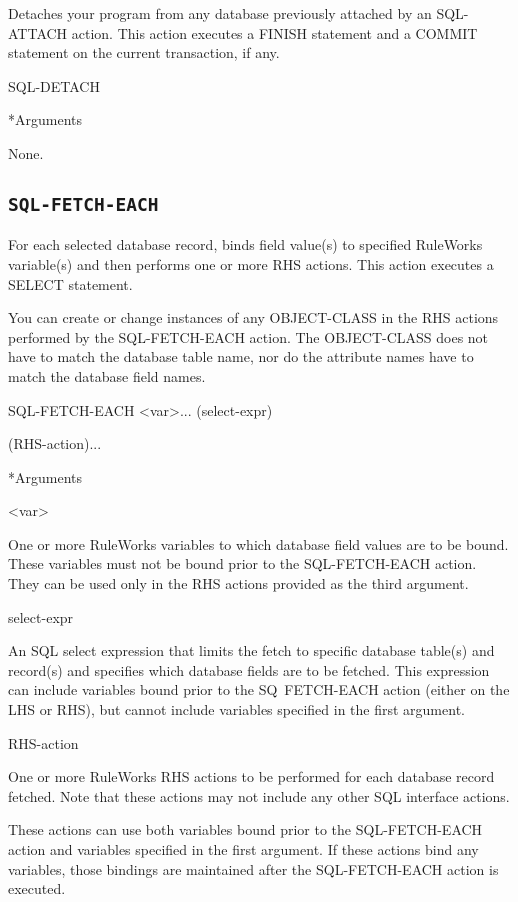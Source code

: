 {{Detaches your program from any database previously attached
by an SQL-ATTACH action. This action executes a FINISH
statement and a COMMIT statement on the current transaction,
if any.



\Format

SQL-DETACH



*Arguments

None.



\subsection{\tt{SQL-FETCH-EACH}}

For each selected database record, binds field value(s) to
specified RuleWorks variable(s) and then performs one or more
RHS actions. This action executes a SELECT statement.

You can create or change instances of any OBJECT-CLASS in the
RHS actions performed by the SQL-FETCH-EACH action. The
OBJECT-CLASS does not have to match the database table name,
nor do the attribute names have to match the database field
names.



\Format

SQL-FETCH-EACH <var>... (select-expr)

(RHS-action)...



*Arguments

<var>

One or more RuleWorks variables to which database field
values are to be bound. These variables must not be bound
prior to the SQL-FETCH-EACH action. They can be used only in
the RHS actions provided as the third argument.

select-expr

An SQL select expression that limits the fetch to specific
database table(s) and record(s) and specifies which database
fields are to be fetched. This expression can include
variables bound prior to the SQ~FETCH-EACH action (either on
the LHS or RHS), but cannot include variables specified in
the first argument.

RHS-action

One or more RuleWorks RHS actions to be performed for each
database record fetched. Note that these actions may not
include any other SQL interface actions.

These actions can use both variables bound prior to the
SQL-FETCH-EACH action and variables specified in the first
argument. If these actions bind any variables, those bindings
are maintained after the SQL-FETCH-EACH action is executed.



}}
